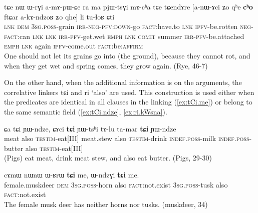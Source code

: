 \documentclass[oldfontcommands,oneside,a4paper,11pt]{article}
\newcommand{\ipa}[1]{{\phon \mbox{#1}}} %
\newcommand{\refb}[1]{(\ref{#1})}
\begin{document}
\begin{exe}
\ex \label{ex:Zo.qhe.cho}
\gll
\ipa{tɕe}  	\ipa{nɯ}  	\ipa{ɯ-rɣi}  	\ipa{a-mɤ-pɯ-ɕe}  	\ipa{ra}  	\ipa{ma}  	\ipa{pjɯ-tsɣi}  	\ipa{mɤ-cʰa}  	\ipa{tɕe}  \ipa{tɕendɤre}  	[\ipa{a-nɯ-ɤci}  	\ipa{ʑo}  	\ipa{qʰe}  	\ipa{\textbf{cʰo}}  	\ipa{ftɕar}  	\ipa{a-kɤ-ndzoʁ}  	\ipa{ʑo}  	\ipa{qhe}]  	\ipa{li}  	\ipa{tu-ɬoʁ}  	\ipa{ɕti}  \\
\textsc{lnk} \textsc{dem} \textsc{3sg.poss}-grain \textsc{irr-neg-pfv:down}-go \textsc{fact}:have.to \textsc{lnk} \textsc{ipfv}-be.rotten \textsc{neg-fact}:can \textsc{lnk} \textsc{lnk} \textsc{irr-pfv}-get.wet \textsc{emph} \textsc{lnk} \textsc{comit} summer \textsc{irr-pfv}-be.attached \textsc{emph} \textsc{lnk} again \textsc{ipfv}-come.out \textsc{fact}:be:\textsc{affirm} \\
\glt One should not let its grains go into (the ground), because they cannot rot, and when they get wet and   spring comes, they grow again. (Rye, 46-7)
\end{exe}

On the other hand, when the additional information is on the arguments, the correlative linkers \ipa{tɕi} and \ipa{ri} `also' are used. This construction is used either when the predicates are identical in all clauses in the linking \refb{ex:tCi.me} or belong to the same semantic field (\ref{ex:tCi.ndze}, \ref{ex:ri.kWsna}).

 \begin{exe}
\ex \label{ex:tCi.ndze}
\gll
\ipa{ɕa}  	\ipa{tɕi}  	\ipa{ɲɯ-ndze,}  	\ipa{ɕɤci}  	\ipa{\textbf{tɕi}}  	\ipa{ɲɯ-tsʰi}  	\ipa{tɤ-lu}  	\ipa{ta-mar}  	\ipa{\textbf{tɕi}}  	\ipa{ɲɯ-ndze}  \\
meat also \textsc{testim}-eat[III] meat.stew also \textsc{testim}-drink  \textsc{indef.poss}-milk \textsc{indef.poss}-butter also \textsc{testim}-eat[III] \\
\glt  (Pigs) eat meat, drink meat stew, and also eat butter. (Pigs, 29-30)
\end{exe}


 \begin{exe}
\ex \label{ex:tCi.me}
\gll
\ipa{cɤmɯ}  	\ipa{nɯnɯ}  	\ipa{ɯ-ʁrɯ}  	\ipa{\textbf{tɕi}}  	\ipa{me,}  	\ipa{ɯ-ndzɣi}  	\ipa{\textbf{tɕi}}  	\ipa{me.}  \\
female.muskdeer \textsc{dem} \textsc{3sg.poss}-horn also \textsc{fact}:not.exist \textsc{3sg.poss}-tusk also \textsc{fact}:not.exist \\
\glt The female musk deer has neither horns nor tusks.  (muskdeer, 34)
\end{exe}
\end{document}
